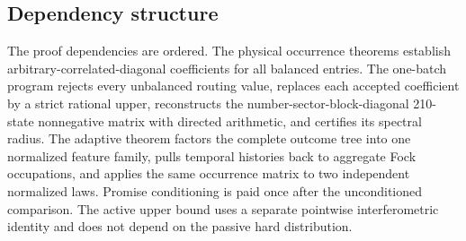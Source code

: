 \subsection{Dependency structure}

The proof dependencies are ordered. The physical occurrence theorems establish arbitrary-correlated-diagonal coefficients for all balanced entries. The one-batch program rejects every unbalanced routing value, replaces each accepted coefficient by a strict rational upper, reconstructs the number-sector-block-diagonal 210-state nonnegative matrix with directed arithmetic, and certifies its spectral radius. The adaptive theorem factors the complete outcome tree into one normalized feature family, pulls temporal histories back to aggregate Fock occupations, and applies the same occurrence matrix to two independent normalized laws. Promise conditioning is paid once after the unconditioned comparison. The active upper bound uses a separate pointwise interferometric identity and does not depend on the passive hard distribution.
